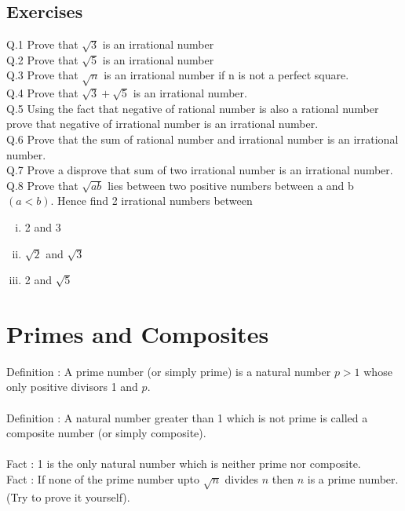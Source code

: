 \documentclass[a4paper,10pt]{article}
\begin{document}
\subsection{Exercises}
Q.1 Prove that $\sqrt{3}$ is an irrational number\\
Q.2 Prove that $\sqrt{5}$ is an irrational number\\
Q.3 Prove that $\sqrt{n}$ is an irrational number if n is not a
perfect square.\\
Q.4 Prove that $\sqrt{3}+\sqrt{5}$ is an irrational number.\\
Q.5 Using the fact that negative of rational number is also a
rational number prove that
negative of irrational number is an irrational number.\\
Q.6 Prove that the sum of rational number and irrational
number is an irrational number.\\
Q.7 Prove a disprove that sum of two irrational number is an
irrational number.\\
Q.8 Prove that $\sqrt{ab}$ lies between two positive numbers between a
and b $(a < b)$. Hence find 2
irrational numbers between\\
\begin{multicols}{3}
\begin{enumerate}[(i)]
\item 2 and 3
\item $\sqrt{2}$ and $\sqrt{3}$
\item 2 and $\sqrt{5}$
\end{enumerate}
\end{multicols}
\section{Primes and Composites}
Definition : A prime number (or simply prime) is a natural number $p >1$
whose only positive divisors 1 and $p$.\\\\
Definition : A natural number greater than 1 which is not prime is called
a composite number (or simply composite).\\\\
Fact : 1 is the only natural number which is neither prime nor
composite.\\
Fact : If none of the prime number upto
$\sqrt{n}$ divides $n$ then $n$ is a prime number. (Try to prove
it yourself).\\\\
\end{document}
